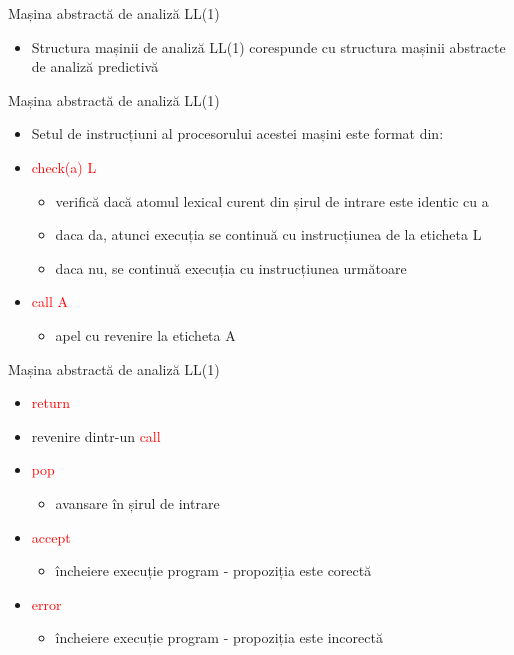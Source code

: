 \documentclass[pdf]{beamer}
\begin{document}
\begin{frame}{Mașina abstractă de analiză LL(1)}
\begin{itemize}
\item
Structura mașinii de analiză LL(1) corespunde cu structura mașinii abstracte de analiză predictivă
\end{itemize}
\end{frame}



\begin{frame}{Mașina abstractă de analiză LL(1)}
\begin{itemize}
\item
Setul de instrucțiuni al procesorului acestei mașini este format din:

\item
\textcolor{red}{check(a) L}
\begin{itemize}
\item
verifică dacă atomul lexical curent din șirul de intrare este identic cu a
\item
daca da, atunci execuția se continuă cu instrucțiunea de la eticheta L
\item
daca nu, se continuă execuția cu instrucțiunea următoare
\end{itemize}

\item
\textcolor{red}{call A}
\begin{itemize}
\item
apel cu revenire la eticheta A
\end{itemize}
\end{itemize}
\end{frame}



\begin{frame}{Mașina abstractă de analiză LL(1)}
\begin{itemize}
\item
\textcolor{red}{return}
\item
\begin{itemize}
revenire dintr-un \textcolor{red}{call}
\end{itemize}
\item
\textcolor{red}{pop}
\begin{itemize}
\item
avansare în șirul de intrare
\end{itemize}
\item
\textcolor{red}{accept}
\begin{itemize}
\item
încheiere execuție program - propoziția este corectă
\end{itemize}
\item
\textcolor{red}{error}
\begin{itemize}
\item
încheiere execuție program - propoziția este incorectă
\end{itemize}
\end{itemize}
\end{frame}
\end{document}
